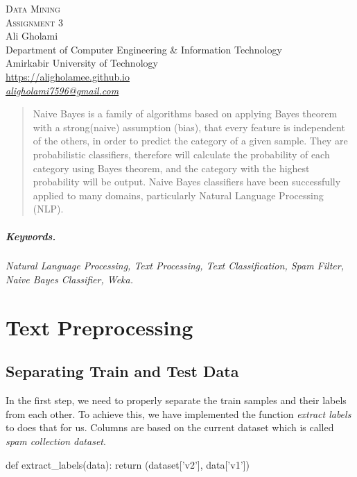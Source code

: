 \documentclass[12pt]{article}
\numberwithin{equation}{section}
\numberwithin{table}{section}
\numberwithin{figure}{section}
\begin{document}

\begin{center}
\textsc{\Huge Data Mining} \\[2pt]
	\textsc{\Large Assignment 3}\\
	\vspace{0.5cm}
  Ali Gholami \\[6pt]
  Department of Computer Engineering \& Information Technology\\
  Amirkabir University of Technology  \\[6pt]
  \def\UrlFont{\em}
  \url{https://aligholamee.github.io}\\
\href{mailto:aligholami7596@gmail.com}{\textit{aligholami7596@gmail.com}}
\end{center}

\begin{abstract}
 Naive Bayes is a family of algorithms based on applying Bayes theorem with a strong(naive) assumption (bias), that every feature is independent of the others, in order to predict the category of a given sample. They are probabilistic classifiers, therefore will calculate the probability of each category using Bayes theorem, and the category with the highest probability will be output. Naive Bayes classifiers have been successfully applied to many domains, particularly Natural Language Processing (NLP).
\end{abstract} 

\subparagraph{Keywords.} \textit{Natural Language Processing, Text Processing, Text Classification, Spam Filter, Naive Bayes Classifier, Weka.}

\section{Text Preprocessing}
\subsection{Separating Train and Test Data}
In the first step, we need to properly separate the train samples and their labels from each other. To achieve this, we have implemented the function \textit{extract labels} to does that for us. Columns are based on the current dataset which is called \textit{spam collection dataset}.

\begin{python}
	def extract_labels(data):
		return (dataset['v2'], data['v1'])
\end{python}
\end{document}
